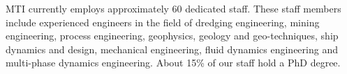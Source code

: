\documentclass[a4paper,11pt]{texMemo} %
\begin{document}
MTI currently employs approximately 60 dedicated staff. These staff members include experienced engineers in the field of dredging engineering, mining engineering, process engineering, geophysics, geology and geo-techniques, ship dynamics and design, mechanical engineering, fluid dynamics engineering and multi-phase dynamics engineering. About 15\% of our staff hold a PhD degree.

\end{document}
